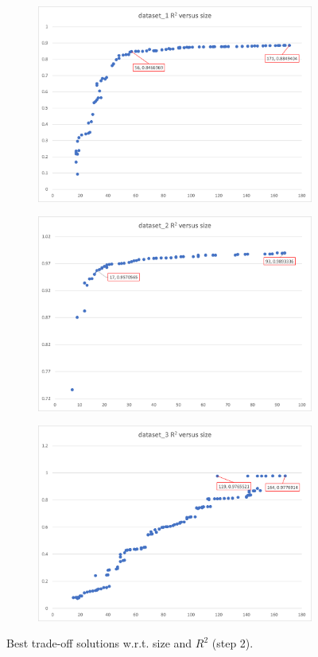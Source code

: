 \documentclass{article}
\begin{document}
\begin{figure}[ht]
\begin{subfigure}{.5\textwidth}
  \centering
  \includegraphics[width=0.95\linewidth]{solutions1.png}
  \label{fig:sfig1}
\end{subfigure}%
\begin{subfigure}{.5\textwidth}
  \centering
  \includegraphics[width=0.95\linewidth]{solutions2.png}
  \label{fig:sfig2}
  
\end{subfigure}
\begin{subfigure}{1\textwidth}
  \centering
  \includegraphics[width=0.5\linewidth]{solutions3.png}
  \label{fig:sfig3}
\end{subfigure}
\caption{Best trade-off solutions w.r.t. size and $R^2$ (step 2).}
\label{fig:fig_tradeoff}
\end{figure}



 
\end{document}
